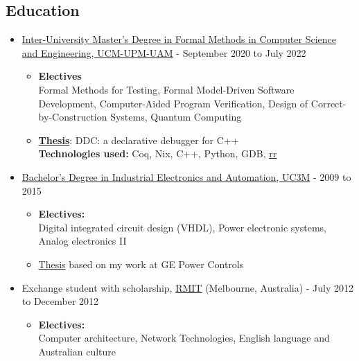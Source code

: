 \documentclass[11pt]{article}
\begin{document}
\subsection*{Education}
\label{sec:orgae8fdc0}
\begin{itemize}
\item \href{https://www.ucm.es/data/cont/docs/titulaciones/1426\_en.pdf}{Inter-University Master’s Degree in Formal Methods in Computer Science and Engineering, UCM-UPM-UAM} - September 2020 to July 2022\\
\begin{itemize}
\item \textbf{Electives}\\
Formal Methods for Testing, Formal Model-Driven Software Development, Computer-Aided Program Verification, Design of Correct-by-Construction Systems, Quantum Computing\\
\item \textbf{\href{https://github.com/RCoeurjoly/TFM/blob/master/TFM.pdf}{Thesis}}: DDC: a declarative debugger for C++\\
\textbf{Technologies used:} Coq, Nix, C++, Python, GDB, \href{https://rr-project.org}{rr}\\
\end{itemize}
\item \href{http://uc3m.eu/ss/Satellite/Grado/en/Detalle/Estudio\_C/1371212539645/1371212987094/Bachelor\_s\_Degree\_in\_Industrial\_Electronics\_and\_Automation\_Engineering}{Bachelor's Degree in Industrial Electronics and Automation, UC3M} - 2009 to 2015\\
\begin{itemize}
\item \textbf{Electives:}\\
Digital integrated circuit design (VHDL), Power electronic systems, Analog electronics II\\
\item \href{https://core.ac.uk/reader/44311180}{Thesis} based on my work at GE Power Controls\\
\end{itemize}
\item Exchange student with scholarship, \href{https://www.rmit.edu.au/}{RMIT} (Melbourne, Australia) - July 2012 to December 2012\\
\begin{itemize}
\item \textbf{Electives:}\\
Computer architecture, Network Technologies, English language and Australian culture\\
\end{itemize}
\end{itemize}
\end{document}
